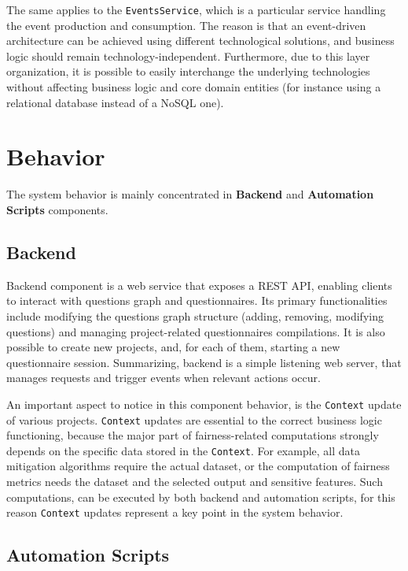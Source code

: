 \documentclass[12pt,a4paper,openright,twoside]{book}
\begin{document}
The same applies to the \texttt{EventsService}, which is a particular service handling the event production and consumption.
%
The reason is that an event-driven architecture can be achieved using different technological solutions, and business logic should remain technology-independent.
%
Furthermore, due to this layer organization, it is possible to easily interchange the underlying technologies without affecting business logic and core domain entities (for instance using a relational database instead of a NoSQL one).


\section{Behavior}

The system behavior is mainly concentrated in \textbf{Backend} and \textbf{Automation Scripts} components.

\subsection{Backend}

Backend component is a web service that exposes a REST \ac{API}, enabling clients to interact with questions graph and questionnaires.
%
Its primary functionalities include modifying the questions graph structure (adding, removing, modifying questions) and managing project-related questionnaires compilations.
%
It is also possible to create new projects, and, for each of them, starting a new questionnaire session.
%
Summarizing, backend is a simple listening web server, that manages requests and trigger events when relevant actions occur.

An important aspect to notice in this component behavior, is the \texttt{Context} update of various projects.
%
\texttt{Context} updates are essential to the correct business logic functioning, because the major part of fairness-related computations strongly depends on the specific data stored in the \texttt{Context}.
%
For example, all data mitigation algorithms require the actual dataset, or the computation of fairness metrics needs the dataset and the selected output and sensitive features.
%
Such computations, can be executed by both backend and automation scripts, for this reason \texttt{Context} updates represent a key point in the system behavior.

\subsection{Automation Scripts}
\end{document}

